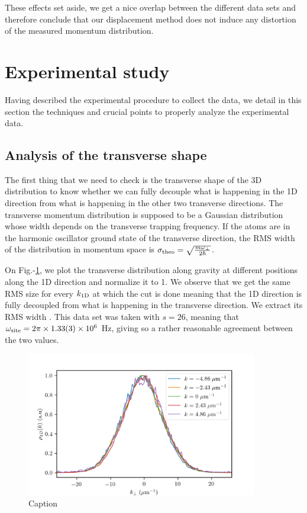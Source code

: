 These effects set aside, we get a nice overlap between the different data sets and therefore conclude that our displacement method does not induce any distortion of the measured momentum distribution. 

\section{Experimental study}

Having described the experimental procedure to collect the data, we detail in this section the techniques and crucial points to properly analyze the experimental data.

\subsection{Analysis of the transverse shape}

The first thing that we need to check is the transverse shape of the 3D distribution to know whether we can fully decouple what is happening in the 1D direction from what is happening in the other two transverse directions. The transverse momentum distribution is supposed to be a Gaussian distribution whose width depends on the transverse trapping frequency. If the atoms are in the harmonic oscillator ground state of the transverse direction, the RMS width of the distribution in momentum space is $\sigma_{\rm{theo}}=\sqrt{\frac{m \omega_{\perp}}{2 \hbar}}$. 

On Fig.-\ref{fig:1D_transverse}, we plot the transverse distribution along gravity at different positions along the 1D direction and normalize it to 1. We observe that we get the same RMS size for every $k_{\rm{1D}}$ at which the cut is done meaning that the 1D direction is fully decoupled from what is happening in the transverse direction. We extract its RMS width . This data set was taken with $s=26$, meaning that $\omega_{\rm{site}}=2 \pi \times 1.33(3) \times 10^6$ Hz, giving  so a rather reasonable agreement between the two values. 

\begin{figure}
    \centering
    \includegraphics[width=0.9\textwidth]{Fig/Chapter5/1D_transverse_effect.png}
    \caption{Caption}
    \label{fig:1D_transverse}
\end{figure}


